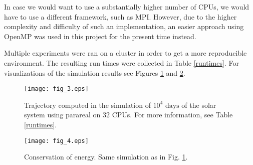\documentclass[conference]{IEEEtran}
\begin{document}
In case we would want to use a substantially higher number of CPUs, we would have to use a different framework, such as MPI. However, due to the higher complexity and difficulty of such an implementation, an easier approach using OpenMP was used in this project for the present time instead.

Multiple experiments were ran on a cluster in order to get a more reproducible environment. The resulting run times were collected in Table \ref{runtimes}. For visualizations of the simulation results see Figures \ref{sim} and \ref{energy}.

\begin{figure}[htbp]
\centerline{\texttt{[image: fig\_3.eps]}}
\caption{Trajectory computed in the simulation of $10^4\text{ days}$ of the solar system using parareal on 32 CPUs. For more information, see Table \ref{runtimes}.}
\label{sim}
\end{figure}

\begin{figure}[htbp]
\centerline{\texttt{[image: fig\_4.eps]}}
\caption{Conservation of energy. Same simulation as in Fig. \ref{sim}.}
\label{energy}
\end{figure}
\end{document}
